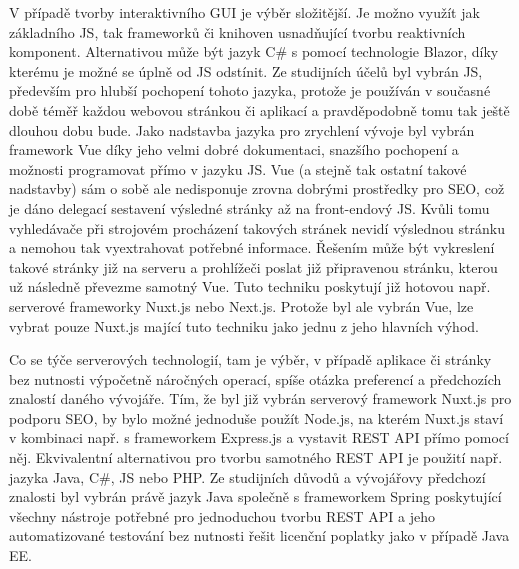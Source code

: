 	V případě tvorby interaktivního \Ac{GUI} je výběr složitější.
	Je možno využít jak základního \ac{JS}, tak frameworků či knihoven usnadňující tvorbu reaktivních komponent.
	Alternativou může být jazyk C\# s pomocí technologie Blazor, díky kterému je možné se úplně od \ac{JS} odstínit.
	Ze studijních účelů byl vybrán \ac{JS}, především pro hlubší pochopení tohoto jazyka, protože je používán v současné
	době téměř každou webovou stránkou či aplikací a pravděpodobně tomu tak ještě dlouhou dobu bude.
	Jako nadstavba jazyka pro zrychlení vývoje byl vybrán framework Vue díky jeho velmi dobré dokumentaci, snazšího
	pochopení a možnosti programovat přímo v jazyku \ac{JS}.
	Vue (a stejně tak ostatní takové nadstavby) sám o sobě ale nedisponuje zrovna dobrými prostředky pro \Ac{SEO},
	což je dáno delegací sestavení výsledné stránky až na front-endový \ac{JS}.
	Kvůli tomu vyhledávače při strojovém procházení takových stránek nevidí výslednou stránku a nemohou tak
	vyextrahovat potřebné informace.
	Řešením může být vykreslení takové stránky již na serveru a prohlížeči poslat již připravenou stránku, kterou už
	následně převezme samotný Vue.
	Tuto techniku poskytují již hotovou např. serverové frameworky Nuxt.js nebo Next.js.
	Protože byl ale vybrán Vue, lze vybrat pouze Nuxt.js mající tuto techniku jako jednu z jeho hlavních výhod.

	Co se týče serverových technologií, tam je výběr, v případě aplikace či stránky bez nutnosti výpočetně náročných operací,
	spíše otázka preferencí a předchozích znalostí daného vývojáře.
	Tím, že byl již vybrán serverový framework Nuxt.js pro podporu \Ac{SEO}, by bylo možné jednoduše použít Node.js, na kterém
	Nuxt.js staví v kombinaci např. s frameworkem Express.js a vystavit \Ac{REST} API přímo pomocí něj.
	Ekvivalentní alternativou pro tvorbu samotného \Ac{REST} API je použití např. jazyka Java, C\#, \ac{JS} nebo \Ac{PHP}.
	Ze studijních důvodů a vývojářovy předchozí znalosti byl vybrán právě jazyk Java společně s frameworkem
	Spring poskytující všechny nástroje potřebné pro jednoduchou tvorbu \Ac{REST} API a jeho automatizované testování
	bez nutnosti řešit licenční poplatky jako v případě Java EE.